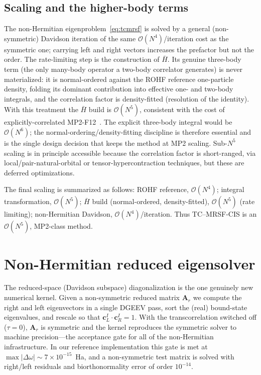 \documentclass[aps,prb,reprint,superscriptaddress,floatfix]{revtex4-2}
\newcommand{\Hbar}{\bar{H}}
\begin{document}
\subsection{Scaling and the higher-body terms}

The non-Hermitian eigenproblem~\eqref{eq:tcmrsf} is solved by a general
(non-symmetric) Davidson iteration of the same $\mathcal{O}(N^4)$/iteration cost
as the symmetric one; carrying left and right vectors increases the prefactor but
not the order. The rate-limiting step is the construction of $\Hbar$. Its genuine
three-body term (the only many-body operator a two-body correlator generates) is
never materialized: it is normal-ordered against the ROHF reference one-particle
density, folding its dominant contribution into effective one- and two-body
integrals, and the correlation factor is density-fitted (resolution of the
identity). With this treatment the $\Hbar$ build is $\mathcal{O}(N^5)$, consistent
with the cost of explicitly-correlated MP2-F12~\cite{tenno2023}. The explicit
three-body integral would be $\mathcal{O}(N^6)$; the normal-ordering/density-fitting
discipline is therefore essential and is the single design decision that keeps the
method at MP2 scaling. Sub-$N^5$ scaling is
in principle accessible because the correlation factor is short-ranged, via
local/pair-natural-orbital or tensor-hypercontraction techniques, but these are
deferred optimizations.

The final scaling is summarized as follows: ROHF reference, $\mathcal{O}(N^4)$;
integral transformation, $\mathcal{O}(N^5)$; $\Hbar$ build (normal-ordered,
density-fitted), $\mathcal{O}(N^5)$ (rate limiting); non-Hermitian Davidson,
$\mathcal{O}(N^4)$/iteration. Thus TC--MRSF-CIS is an $\mathcal{O}(N^5)$,
MP2-class method.

\section{Non-Hermitian reduced eigensolver}\label{sec:eigensolver}

The reduced-space (Davidson subspace) diagonalization is the one genuinely new
numerical kernel. Given a non-symmetric reduced matrix $\mathbf{A}_r$ we compute
the right and left eigenvectors in a single DGEEV pass, sort the (real) bound-state
eigenvalues, and rescale so that $\mathbf{c}_L^I\!\cdot\mathbf{c}_R^I=1$. With the
transcorrelation switched off ($\tau=0$), $\mathbf{A}_r$ is symmetric and the
kernel reproduces the symmetric solver to machine precision---the acceptance gate
for all of the non-Hermitian infrastructure. In our reference implementation this
gate is met at $\max|\Delta\omega|\sim7\times10^{-15}$~Ha, and a non-symmetric
test matrix is solved with right/left residuals and biorthonormality error of
order $10^{-14}$.
\end{document}
